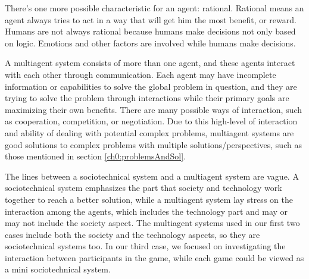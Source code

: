 There's one more possible characteristic for an agent: rational. Rational means an agent always tries to act in a way that will get him the most benefit, or reward. Humans are not always rational because humans make decisions not only based on logic. Emotions and other factors are involved while humans make decisions. 

A multiagent system consists of more than one agent, and these agents interact with each other through communication. Each agent may have incomplete information or capabilities to solve the global problem in question, and they are trying to solve the problem through interactions while their primary goals are maximizing their own benefits. There are many possible ways of interaction, such as cooperation, competition, or negotiation. Due to this high-level of interaction and ability of dealing with potential complex problems, multiagent systems are good solutions to complex problems with multiple solutions/perspectives, such as those mentioned in section \ref{ch0:problemsAndSol}. 

The lines between a sociotechnical system and a multiagent system are vague. A sociotechnical system emphasizes the part that society and technology work together to reach a better solution, while a multiagent system lay stress on the interaction among the agents, which includes the technology part and may or may not include the society aspect. The multiagent systems used in our first two cases include both the society and the technology aspects, so they are sociotechnical systems too. In our third case, we focused on investigating the interaction between participants in the game, while each game could be viewed as a mini sociotechnical system.  

